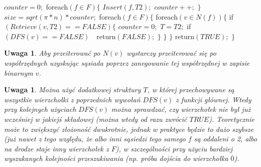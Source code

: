 \documentclass{pracamgr}
\newtheorem{remark}[theorem]{Uwaga}
\begin{document}
    \hspace*{16pt}	$counter=0;$\newline
    \hspace*{16pt}	foreach$(f\in F)\{$\newline
    \hspace*{32pt}		$Insert(f,T2);$\newline
    \hspace*{32pt}		$counter++;$\newline
    \hspace*{16pt}	$\}$\newline
    \hspace*{16pt}	$size=sqrt(\pi*n)*counter;$\newline
    \hspace*{16pt}	foreach$(f\in F)\{$\newline
    \hspace*{32pt}		foreach$(v\in N(f))\{$\newline
    \hspace*{48pt}			if$(Retrieve(v,T2)==FALSE)\{$\newline
    \hspace*{64pt}				$counter=0;$\newline
    \hspace*{64pt}				$T=T2;$\newline
    \hspace*{64pt}				if$(DFS(v)==FALSE)\quad $return$(FALSE);$\newline
    \hspace*{48pt}			$\}$\newline
    \hspace*{32pt}		$\}$\newline
    \hspace*{16pt}	$\}$\newline
    \hspace*{16pt}	return$(TRUE);$\newline
    \hspace*{0pt}$\}$\newline
    \begin{remark}\label{przeszukiwanie N(v)}
     Aby przeiterować po $N(v)$ wystarczy przeiterować się po współrzędnych uzyskując sąsiada poprzez zanegowanie tej współrzędnej w zapisie binarnym $v$.
    \end{remark}
    \begin{remark}\label{dwie struktury T}
     Można użyć dodatkowej struktury $T$, w której przechowywane są wszystkie wierzchołki z poprzednich wywołań $DFS(v)$ z funkcji głównej.
     Wtedy przy kolejnych użyciach $DFS(v)$ można sprawdzać, czy wierzchołek nie był już wcześniej w jakiejś składowej (można wtedy od razu zwrócić $TRUE$).
     Teoretycznie może to zwiększyć złożoność dwukrotnie, jednak w praktyce będzie to dużo szybsze
     (już nawet z tego względu, że albo inni sąsiedzi tego samego $f$ są oddaleni o 2, albo na drodze staje inny wierzchołek z $F$),
     w szczególności przy użyciu bardziej wyszukanych kolejności przeszukiwania (np. próba dojścia do wierzchołka $\overline{0}$).
    \end{remark}
     
\end{document}
